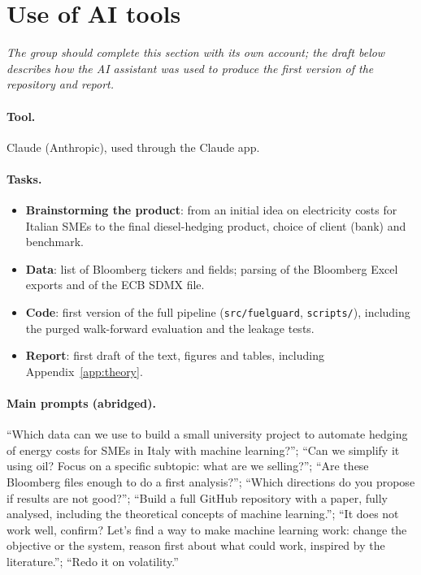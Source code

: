 \section{Use of AI tools}\label{app:ai}

\emph{The group should complete this section with its own account; the draft below describes how the
AI assistant was used to produce the first version of the repository and report.}

\paragraph{Tool.} Claude (Anthropic), used through the Claude app.

\paragraph{Tasks.}
\begin{itemize}
\item \textbf{Brainstorming the product}: from an initial idea on electricity costs for Italian SMEs to
the final diesel-hedging product, choice of client (bank) and benchmark.
\item \textbf{Data}: list of Bloomberg tickers and fields; parsing of the Bloomberg Excel exports and of
the ECB SDMX file.
\item \textbf{Code}: first version of the full pipeline (\texttt{src/fuelguard}, \texttt{scripts/}),
including the purged walk-forward evaluation and the leakage tests.
\item \textbf{Report}: first draft of the text, figures and tables, including Appendix~\ref{app:theory}.
\end{itemize}

\paragraph{Main prompts (abridged).} ``Which data can we use to build a small university project to
automate hedging of energy costs for SMEs in Italy with machine learning?''; ``Can we simplify it using oil?
Focus on a specific subtopic: what are we selling?''; ``Are these Bloomberg files enough to do a first
analysis?''; ``Which directions do you propose if results are not good?''; ``Build a full GitHub repository
with a paper, fully analysed, including the theoretical concepts of machine learning.''; ``It does not work
well, confirm? Let's find a way to make machine learning work: change the objective or the system, reason
first about what could work, inspired by the literature.''; ``Redo it on volatility.''

